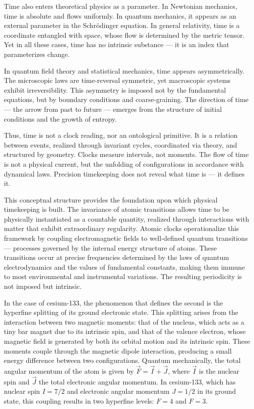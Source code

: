 Time also enters theoretical physics as a parameter. In Newtonian mechanics, time is absolute and flows uniformly. In quantum mechanics, it appears as an external parameter in the Schrödinger equation. In general relativity, time is a coordinate entangled with space, whose flow is determined by the metric tensor. Yet in all these cases, time has no intrinsic substance — it is an index that parameterizes change.

In quantum field theory and statistical mechanics, time appears asymmetrically. The microscopic laws are time-reversal symmetric, yet macroscopic systems exhibit irreversibility. This asymmetry is imposed not by the fundamental equations, but by boundary conditions and coarse-graining. The direction of time — the arrow from past to future — emerges from the structure of initial conditions and the growth of entropy.

Thus, time is not a clock reading, nor an ontological primitive. It is a relation between events, realized through invariant cycles, coordinated via theory, and structured by geometry. Clocks measure intervals, not moments. The flow of time is not a physical current, but the unfolding of configurations in accordance with dynamical laws. Precision timekeeping does not reveal what time is — it defines it.

This conceptual structure provides the foundation upon which physical timekeeping is built. The invariance of atomic transitions allows time to be physically instantiated as a countable quantity, realized through interactions with matter that exhibit extraordinary regularity. Atomic clocks operationalize this framework by coupling electromagnetic fields to well-defined quantum transitions — processes governed by the internal energy structure of atoms. These transitions occur at precise frequencies determined by the laws of quantum electrodynamics and the values of fundamental constants, making them immune to most environmental and instrumental variations. The resulting periodicity is not imposed but intrinsic.

In the case of cesium-133, the phenomenon that defines the second is the hyperfine splitting of its ground electronic state. This splitting arises from the interaction between two magnetic moments: that of the nucleus, which acts as a tiny bar magnet due to its intrinsic spin, and that of the valence electron, whose magnetic field is generated by both its orbital motion and its intrinsic spin. These moments couple through the magnetic dipole interaction, producing a small energy difference between two configurations. Quantum mechanically, the total angular momentum of the atom is given by $\vec{F} = \vec{I} + \vec{J}$, where $\vec{I}$ is the nuclear spin and $\vec{J}$ the total electronic angular momentum. In cesium-133, which has nuclear spin $I = 7/2$ and electronic angular momentum $J = 1/2$ in its ground state, this coupling results in two hyperfine levels: $F = 4$ and $F = 3$.

